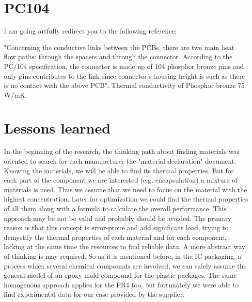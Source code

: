 \documentclass[final]{cubedoc}
\begin{document}
	\section{PC104}
	
	I am going artfully redirect you to the following reference:
	
	"Concerning the conductive links between the PCBs, there are two main heat ﬂow paths: through the spacers and through the connector. According to the PC/104 speciﬁcation, the connector is made up of 104 phosphor bronze pins and only pins contributes to the link since connector’s housing height is such as there is no contact with the above PCB". Thermal conductivity of Phosphor bronze 75 W/mK\cite[p.104]{jacques2009thermal}. 
	
	
	
	\section{Lessons learned}\label{lessons_learned}
	
	In the beginning of the research, the thinking path about finding materials was oriented to search for each manufacturer the "material declaration" document. Knowing the materials, we will be able to find its thermal properties. But for each part of the component we are interested (e.g. encapsulation) a mixture of materials is used. Thus we assume that we need to focus on the material with the highest concentration. Later for optimization we could find the thermal properties of all them along with a formula to calculate the overall performance. This approach may be not be valid and probably should be avoided. The primary reason is that this concept is error-prone and add significant load, trying to demystify the thermal properties of each material and for each component, lacking at the same time the resources to find reliable data. A more abstract way of thinking is may required. So as it is mentioned before, in the IC packaging, a process which several chemical compounds are involved, we can safely assume the general model of an epoxy mold compound for the plastic packages. The same homogenous approach applies for the FR4 too, but fortunately we were able to find experimental data for our case provided by the supplier.
	
	
\end{document}
